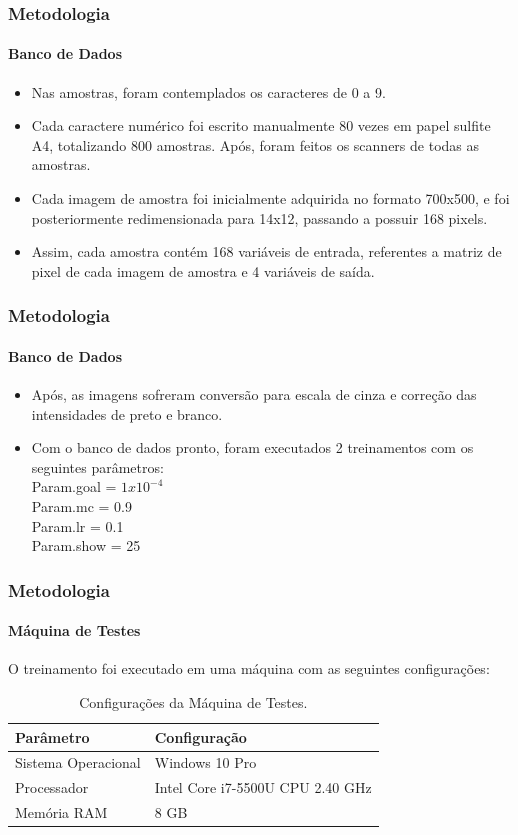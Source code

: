 	\begin{frame}
		\frametitle{Metodologia}
		\framesubtitle{Banco de Dados}
		\begin{itemize}
			\item Nas amostras, foram contemplados os caracteres de 0 a 9.
			\item Cada caractere numérico foi escrito manualmente 80 vezes em papel sulfite A4, totalizando 800 amostras. Após, foram feitos os scanners de todas as amostras.
			\item Cada imagem de amostra foi inicialmente adquirida no formato 700x500, e foi posteriormente redimensionada para 14x12, passando a possuir 168 pixels.
			\item Assim, cada amostra contém 168 variáveis de entrada, referentes a matriz de pixel de cada imagem de amostra e 4 variáveis de saída.
			
		\end{itemize}

	\end{frame}


\begin{frame}
	\frametitle{Metodologia}
	\framesubtitle{Banco de Dados}
	\begin{itemize}
		\item Após, as imagens sofreram conversão para escala de cinza e correção das intensidades de preto e branco.
		\item Com o banco de dados pronto, foram executados 2 treinamentos com os seguintes parâmetros:\vspace{0.3cm}
\\
Param.goal = $ 1x10^{-4} $\\
Param.mc = 0.9\\
Param.lr = 0.1\\
Param.show = 25
	\end{itemize}
	
\end{frame}

\begin{frame}
	\frametitle{Metodologia}
	\framesubtitle{Máquina de Testes}
	O treinamento foi executado em uma máquina com as seguintes configurações:
\begin{table}[H]
	\centering
	\caption{Configurações da Máquina de Testes.}
	\label{my-label}
	\begin{tabular}{@{}|l|l|@{}}
		\toprule
		\textbf{Parâmetro}  & \textbf{Configuração}            \\ \midrule
		Sistema Operacional & Windows 10 Pro                   \\ \midrule
		Processador         & Intel Core i7-5500U CPU 2.40 GHz \\ \midrule
		Memória RAM         & 8 GB                             \\ \bottomrule
	\end{tabular}
\end{table}
	
\end{frame}

